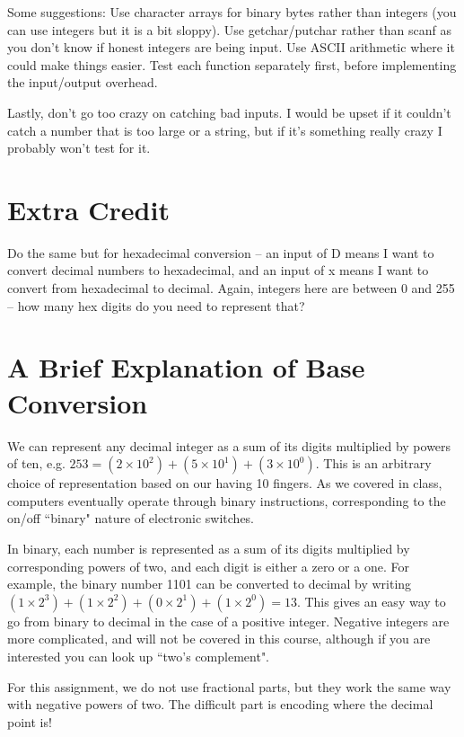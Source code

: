 \documentclass{article}
\begin{document}
Some suggestions: Use character arrays for binary bytes rather than integers (you can use integers but it is a bit sloppy). Use getchar/putchar rather than scanf as you don't know if honest integers are being input. Use ASCII arithmetic where it could make things easier. Test each function separately first, before implementing the input/output overhead.

Lastly, don't go too crazy on catching bad inputs. I would be upset if it couldn't catch a number that is too large or a string, but if it's something really crazy I probably won't test for it.

\section*{Extra Credit}
Do the same but for hexadecimal conversion -- an input of D means I want to convert decimal numbers to hexadecimal, and an input of x means I want to convert from hexadecimal to decimal. Again, integers here are between 0 and 255 -- how many hex digits do you need to represent that?

\section*{A Brief Explanation of Base Conversion}
We can represent any decimal integer as a sum of its digits multiplied by powers of ten, e.g. $253 = (2\times10^2)+(5\times10^1)+(3\times10^0)$. This is an arbitrary choice of representation based on our having 10 fingers. As we covered in class, computers eventually operate through binary instructions, corresponding to the on/off ``binary" nature of electronic switches.

In binary, each number is represented as a sum of its digits multiplied by corresponding powers of two, and each digit is either a zero or a one. For example, the binary number 1101 can be converted to decimal by writing $(1\times2^3)+(1\times2^2)+(0\times2^1)+(1\times2^0) = 13$. This gives an easy way to go from binary to decimal in the case of a positive integer. Negative integers are more complicated, and will not be covered in this course, although if you are interested you can look up ``two's complement".

For this assignment, we do not use fractional parts, but they work the same way with negative powers of two. The difficult part is encoding where the decimal point is!
\end{document}
